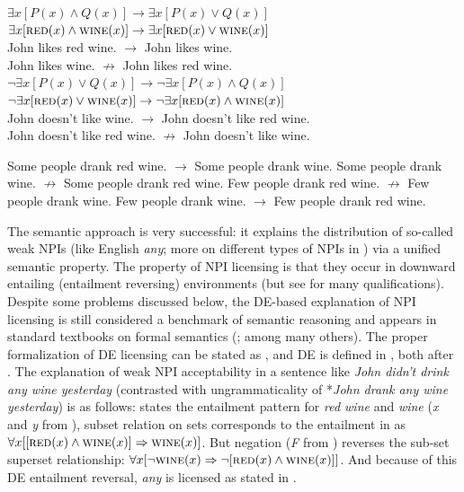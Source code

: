 \documentclass[output=paper,colorlinks,citecolor=brown]{langscibook}
\begin{document}
\ea\label{ex:10}\ea\label{ex:10-a} $\exists x[P(x) \wedge Q(x)] \rightarrow \exists x[P(x) \vee Q(x)]$
\ex\label{ex:10-b} $\exists x[\textsc{red}(x) \wedge \textsc{wine}(x)] \rightarrow \exists x[\textsc{red}(x) \vee \textsc{wine}(x)]$\\
John likes red wine. $\rightarrow$ John likes wine.\\
John likes wine. $\not\rightarrow$ John likes red wine.
\ex\label{ex:10-c}$\neg \exists x[P(x) \vee Q(x)] \rightarrow \neg \exists x[P(x) \wedge Q(x)]$
\ex\label{ex:10-d} $\neg \exists x[\textsc{red}(x) \vee \textsc{wine}(x)] \rightarrow \neg \exists x[\textsc{red}(x) \wedge \textsc{wine}(x)]$\\
John doesn't like wine. $\rightarrow$ John doesn't like red wine.\\
John doesn't like red wine. $\not\rightarrow$ John doesn't like wine.
\z
\z

\ea\label{ex:11}\ea Some people drank red wine. $\rightarrow$ Some people drank wine.
\ex Some people drank wine. $\not\rightarrow$ Some people drank red wine.
\ex Few people drank red wine. $\not\rightarrow$ Few people drank wine.
\ex Few people drank wine. $\rightarrow$ Few people drank red wine.
\z
\z

\noindent The semantic approach is very successful: it explains the distribution of so-called weak NPIs (like English \emph{any}; more on different types of NPIs in ) via a unified semantic property. The property of NPI licensing is that they occur in downward entailing (entailment reversing) environments (but see  for many qualifications). Despite some problems discussed below, the DE-based explanation of NPI licensing is still considered a benchmark of semantic reasoning and appears in standard textbooks on formal semantics (\citealt{portner2005meaning,Coppock.Champollion2024}; among many others). The proper formalization of DE licensing can be stated as , and DE is defined in , both after \citet{von1999npi}. The explanation of weak NPI acceptability in a sentence like \emph{John didn't drink any wine yesterday} (contrasted with ungrammaticality of *\emph{John drank any wine yesterday}) is as follows:  states the entailment pattern for \emph{red wine} and \emph{wine} (\emph{x} and \emph{y} from ), subset relation on sets corresponds to the entailment in  as \(\forall x[[\textsc{red}(x) \wedge \textsc{wine}(x)] \Rightarrow \textsc{wine}(x)]\). But negation (\emph{F} from ) reverses the sub-set superset relationship: \(\forall x[\neg \textsc{wine}(x) \Rightarrow \neg[\textsc{red}(x) \wedge \textsc{wine}(x)]]\). And because of this DE entailment reversal, \emph{any} is licensed as stated in .
\end{document}

